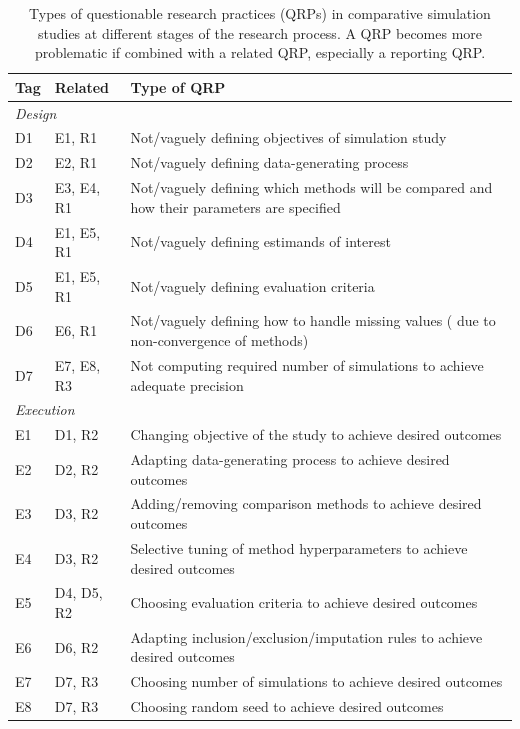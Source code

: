 \documentclass[a4paper, 11pt]{article}
\begin{document}
\begin{table}[!htb]
  \caption{Types of questionable research practices (QRPs) in comparative 
  simulation studies at different stages of the research process. A QRP 
  becomes more problematic if combined with a related QRP, especially a 
  reporting QRP.}
  \label{table:QRPs}
  \centering
	\begin{tabular}{p{} p{} p{}}
		\toprule
		\textbf{Tag} & \textbf{Related} & \textbf{Type of QRP} \\
  		\midrule
    \multicolumn{2}{p{.15\textwidth}}{\textit{Design}} & \\
    D1 & E1, R1 & Not/vaguely defining objectives of simulation study \\
    D2 & E2, R1 & Not/vaguely defining data-generating process \\
    D3 & E3, E4, R1 & Not/vaguely defining which methods will be compared and how their
                  parameters are specified \\
    D4 & E1, E5, R1 & Not/vaguely defining estimands of interest \\
    D5 & E1, E5, R1 & Not/vaguely defining evaluation criteria \\
    D6 & E6, R1 & Not/vaguely defining how to handle missing values 
              (\eg{} due to non-convergence of methods) \\
    D7 & E7, E8, R3 & Not computing required number of simulations to achieve
              adequate precision \\[1em]
  
    \multicolumn{2}{p{.15\textwidth}}{\textit{Execution}} & \\
  	E1 & D1, R2 & Changing objective of the study to achieve desired outcomes \\
    E2 & D2, R2 & Adapting data-generating process to achieve desired outcomes \\
    E3 & D3, R2 & Adding/removing comparison methods to achieve desired outcomes \\
    E4 & D3, R2 & Selective tuning of method hyperparameters to achieve desired outcomes\\
    E5 & D4, D5, R2 & Choosing evaluation criteria to achieve desired outcomes \\
    E6 & D6, R2 & Adapting inclusion/exclusion/imputation rules to achieve desired outcomes \\
    E7 & D7, R3 & Choosing number of simulations to achieve desired outcomes \\
    E8 & D7, R3 & Choosing random seed to achieve desired outcomes \\[1em]
  		

\end{tabular}
\end{table}
\end{document}
